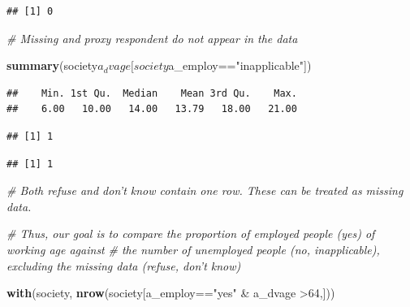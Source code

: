\documentclass[]{article}
\newenvironment{Shaded}{\begin{snugshade}}{\end{snugshade}}
\newcommand{\KeywordTok}[1]{\textcolor[rgb]{0.13,0.29,0.53}{\textbf{{#1}}}}
\newcommand{\DecValTok}[1]{\textcolor[rgb]{0.00,0.00,0.81}{{#1}}}
\newcommand{\CharTok}[1]{\textcolor[rgb]{0.31,0.60,0.02}{{#1}}}
\newcommand{\StringTok}[1]{\textcolor[rgb]{0.31,0.60,0.02}{{#1}}}
\newcommand{\CommentTok}[1]{\textcolor[rgb]{0.56,0.35,0.01}{\textit{{#1}}}}
\newcommand{\NormalTok}[1]{{#1}}
\begin{document}
\begin{verbatim}
## [1] 0
\end{verbatim}

\begin{Shaded}
\begin{Highlighting}[]
\CommentTok{# Missing and proxy respondent do not appear in the data}

\KeywordTok{summary}\NormalTok{(society$a_dvage[society$a_employ==}\StringTok{"inapplicable"}\NormalTok{])}
\end{Highlighting}
\end{Shaded}

\begin{verbatim}
##    Min. 1st Qu.  Median    Mean 3rd Qu.    Max. 
##    6.00   10.00   14.00   13.79   18.00   21.00
\end{verbatim}

\begin{Shaded}
\end{Shaded}

\begin{verbatim}
## [1] 1
\end{verbatim}

\begin{Shaded}
\end{Shaded}

\begin{verbatim}
## [1] 1
\end{verbatim}

\begin{Shaded}
\begin{Highlighting}[]
\CommentTok{# Both refuse and don't know contain one row. These can be treated as missing data.}

\CommentTok{# Thus, our goal is to compare the proportion of employed people (yes) of working age against }
\CommentTok{# the number of unemployed people (no, inapplicable), excluding the missing data (refuse, don't know)}

\KeywordTok{with}\NormalTok{(society, }\KeywordTok{nrow}\NormalTok{(society[a_employ==}\StringTok{"yes"} \NormalTok{&}\StringTok{ }\NormalTok{a_dvage >}\DecValTok{64}\NormalTok{,]))}
\end{Highlighting}
\end{Shaded}
\end{document}
